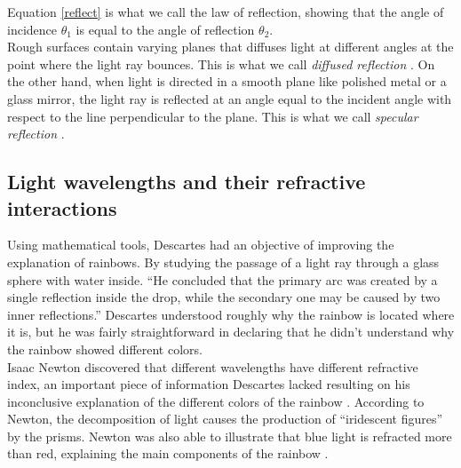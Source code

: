 \documentclass[a4paper,12pt]{article}
\begin{document}
Equation \eqref{reflect} is what we call the law of reflection, showing that the angle of incidence $\theta_1$ is equal to the angle of reflection $\theta_2$.\\

Rough surfaces contain varying planes that diffuses light at different angles at the point where the light ray bounces. This is what we call {\itshape diffused reflection} \cite{refractionnd}.  On the other hand, when light is directed in a smooth plane like polished metal or a glass mirror, the light ray is reflected at an angle equal to the incident angle with respect to the line perpendicular to the plane. This is what we call {\itshape specular reflection} \cite{reflectionnd}.

\subsection{Light wavelengths and their refractive interactions} \label{indices}


Using mathematical tools, Descartes had an objective of improving the explanation of rainbows. By studying the passage of a light ray through a glass sphere with water inside. “He concluded that the primary arc was created by a single reflection inside the drop, while the secondary one may be caused by two inner reflections.” \cite[9]{corradi16} Descartes understood roughly why the rainbow is located where it is, but he was fairly straightforward in declaring that he didn't understand why the rainbow showed different colors. \\

Isaac Newton discovered that different wavelengths have different refractive index, an important piece of information Descartes lacked resulting on his inconclusive explanation of the different colors of the rainbow \cite{casselman09}. According to Newton, the decomposition of light causes the production of “iridescent figures” by the prisms. Newton was also able to illustrate that blue light is refracted more than red, explaining the main components of the rainbow \cite[9]{corradi16}.
\end{document}
